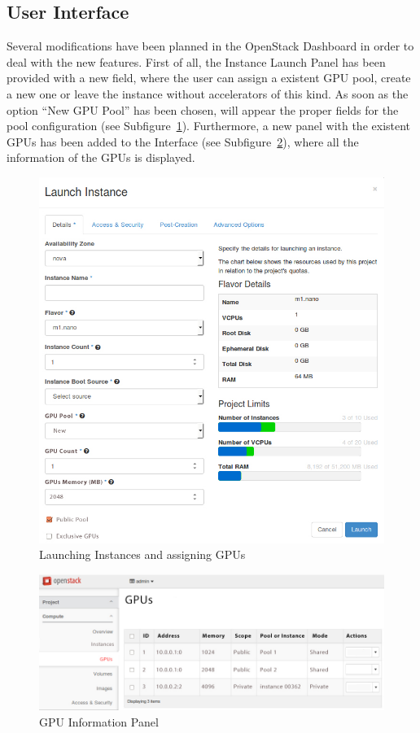 \documentclass[a4paper,twoside]{article}
\begin{document}
\subsection{User Interface}
Several modifications have been planned in the OpenStack Dashboard in order to deal with the new features.
First of all, the Instance Launch Panel has been provided with a new field, where the user can assign a existent GPU pool, create a new one or leave the instance without accelerators of this kind.
As soon as the option ``New GPU Pool'' has been chosen, will appear the proper fields for the pool configuration (see Subfigure~\ref{fig:ui-launch}).
Furthermore, a new panel with the existent GPUs has been added to the Interface (see Subfigure~\ref{fig:ui-rgpus}), where all the information of the GPUs is displayed.

\begin{figure}[!t]
  \centering
  \includegraphics[width=.9\linewidth]{images/UI-launch.jpg}
  \caption{Launching Instances and assigning GPUs}
  \label{fig:ui-launch}
\end{figure}
  
\begin{figure}[!t]
  \centering
  \includegraphics[width=.85\linewidth]{images/UI-rgpus.jpg}
  \caption{GPU Information Panel}
  \label{fig:ui-rgpus}
\end{figure}
\end{document}
